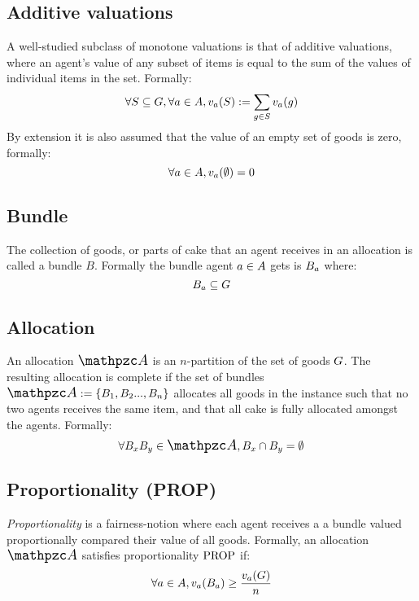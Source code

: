 \subsection*{Additive valuations}
A well-studied subclass of monotone valuations is that of additive valuations, where an agent's value of any subset of items is equal to the sum of the values of individual items in the set. 
Formally: 
$$\forall S \subseteq G,\forall a\in A, v_a(S):=\sum_{g\in S}v_a(g)$$
By extension it is also assumed that the value of an empty set of goods is zero, formally:
$$\forall a\in A, v_a(\emptyset)=0$$



\subsection*{Bundle}
The collection of goods, or parts of cake that an agent receives in an allocation is called a bundle $B$. Formally the bundle agent $a\in A$ gets is $B_a$ where:
$$B_a\subseteq G$$



\subsection*{Allocation}
An allocation $\sAllocation$ is an $n$-partition of the set of goods $G$. The resulting allocation is complete if the set of bundles $\sAllocation := \{\sBundle_1,\sBundle_2...,\sBundle_\sNumAgents\}$ allocates all goods in the instance such that no two agents receives the same item, and that all cake is fully allocated amongst the agents. Formally:
$$\forall\sBundle_x\sBundle_y\in\sAllocation, \sBundle_x\cap\sBundle_y=\emptyset$$




\subsection*{Proportionality (PROP)}
\emph{Proportionality} is a fairness-notion where each agent receives a a bundle valued proportionally compared their value of all goods. Formally, an allocation $\sAllocation$ satisfies proportionality $\text{PROP}$ if:
$$\forall a\in A, v_a(B_a)\geq\frac{v_a(G)}{n}$$



